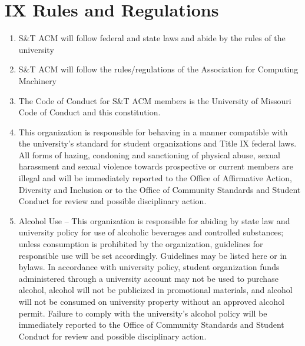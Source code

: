 
\section{IX \textendash{} Rules and Regulations}
  \begin{enumerate}
    \item S\&T ACM will follow federal and state laws and abide by the rules
    of the university
    \item S\&T ACM will follow the rules/regulations of the Association for Computing
    Machinery
    \item The Code of Conduct for S\&T ACM members is the University of
    Missouri Code of Conduct and this constitution.
    \item This organization is responsible for behaving in a manner compatible with
    the university’s standard for student organizations and Title IX federal laws.
    All forms of hazing, condoning and sanctioning of physical abuse, sexual
    harassment and sexual violence towards prospective or current members are
    illegal and will be immediately reported to the Office of Affirmative Action,
    Diversity and Inclusion or to the Office of Community Standards and Student
    Conduct for review and possible disciplinary action.
    \item Alcohol Use – This organization is responsible for abiding by state law
    and university policy for use of alcoholic beverages and controlled substances;
    unless consumption is prohibited by the organization, guidelines for responsible
    use will be set accordingly. {Guidelines may be listed here or in bylaws}. In
    accordance with university policy, student organization funds administered
    through a university account may not be used to purchase alcohol, alcohol will
    not be publicized in promotional materials, and alcohol will not be consumed on
    university property without an approved alcohol permit. Failure to comply with
    the university’s alcohol policy will be immediately reported to the Office of
    Community Standards and Student Conduct for review and possible disciplinary
    action.
  \end{enumerate}